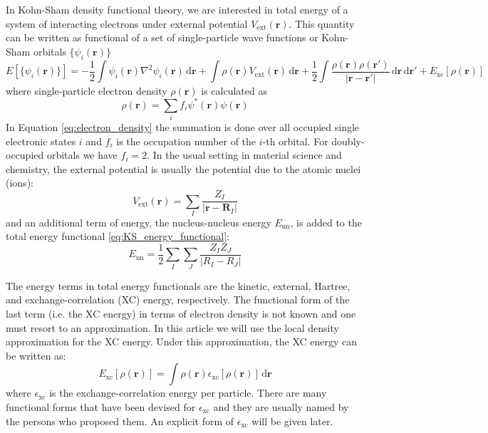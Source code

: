 In Kohn-Sham density functional theory, we are interested in total energy of a system of
interacting electrons
under external potential $V_{\mathrm{ext}}(\mathbf{r})$. This quantity can be written
as functional of
a set of single-particle wave functions or Kohn-Sham orbitals $\{\psi_{i}(\mathbf{r})\}$
\begin{equation}
E\left[\{\psi_{i}(\mathbf{r})\}\right] =
-\frac{1}{2} \int \psi_{i}(\mathbf{r}) \nabla^{2} \psi_{i}(\mathbf{r})\,\mathrm{d}\mathbf{r} +
\int \rho(\mathbf{r}) V_{\mathrm{ext}}(\mathbf{r})\,\mathrm{d}\mathbf{r} +
\frac{1}{2}\int
\frac{\rho(\mathbf{r}) \rho(\mathbf{r}')}{\left|\mathbf{r}-\mathbf{r}'\right|}\,
\mathrm{d}\mathbf{r}\,\mathrm{d}\mathbf{r}' + E_{\mathrm{xc}}\left[\rho(\mathbf{r})\right]
\label{eq:KS_energy_functional}
\end{equation}
%
where single-particle electron density $\rho(\mathbf{r})$ is calculated as
%
\begin{equation}
\rho(\mathbf{r}) = \sum_{i} f_{i} \psi^{*}(\mathbf{r}) \psi(\mathbf{r})
\label{eq:electron_density}
\end{equation}
%
In Equation \ref{eq:electron_density} the summation is done over
all occupied single electronic states $i$ and $f_{i}$
is the occupation number of the $i$-th orbital. For doubly-occupied orbitals
we have $f_{i}=2$.
In the usual setting in material science and chemistry, the external potential
is usually the potential due to the atomic nuclei (ions):
\begin{equation}
V_{\mathrm{ext}}(\mathbf{r}) = \sum_{I} \frac{Z_{I}}{\left|\mathbf{r} - \mathbf{R}_{I}\right|}
\end{equation}
and an additional term of energy, the nucleus-nucleus energy $E_{\mathrm{nn}}$,
is added to the total energy functional \eqref{eq:KS_energy_functional}:
\begin{equation}
E_{\mathrm{nn}} = \frac{1}{2} \sum_{I}\sum_{J}\frac{Z_{I} Z_{J}}{\left| R_{I} - R_{J} \right|}
\end{equation}

The energy terms in total energy functionals are the kinetic, external, Hartree, and exchange-correlation
(XC) energy, respectively. The functional form of the last term (i.e. the XC energy)
in terms of electron density is not known and one must resort to an approximation. In this article
we will use the local density approximation for the XC energy. Under this approximation, the XC energy
can be written as:
\begin{equation}
E_{\mathrm{xc}}\left[\rho(\mathbf{r})\right] =
\int \rho(\mathbf{r}) \epsilon_{\mathrm{xc}}\left[\rho(\mathbf{r})\right]\,\mathrm{d}\mathbf{r}
\end{equation}
where $\epsilon_{\mathrm{xc}}$ is the exchange-correlation energy per particle.
There are many functional forms that have been devised for $\epsilon_{\mathrm{xc}}$
and they are usually named by the persons who proposed them.
An explicit form of $\epsilon_{\mathrm{xc}}$ will be given later.


